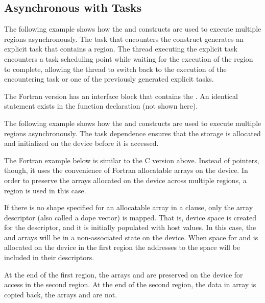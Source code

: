 \subsection{Asynchronous  with Tasks}
\label{subsec:async_target_with_tasks}

The following example shows how the  and  constructs 
are used to execute multiple  regions asynchronously. The task that 
encounters the  construct generates an explicit task that contains 
a  region. The thread executing the explicit task encounters a task 
scheduling point while waiting for the execution of the  region 
to complete, allowing the thread to switch back to the execution of the encountering 
task or one of the previously generated explicit tasks.


The Fortran version has an interface block that contains the  . 
An identical statement exists in the function declaration (not shown here).


The following example shows how the  and  constructs 
are used to execute multiple  regions asynchronously. The task dependence 
ensures that the storage is allocated and initialized on the device before it is 
accessed.


The Fortran example below is similar to the C version above. Instead of pointers, though, it uses
the convenience of Fortran allocatable arrays on the device. In order to preserve the arrays 
allocated on the device across multiple  regions, a ~ region 
is used in this case.

If there is no shape specified for an allocatable array in a  clause, only the array descriptor
(also called a dope vector) is mapped. That is, device space is created for the descriptor, and it
is initially populated with host values. In this case, the  and  arrays will be in a
non-associated state on the device. When space for  and  is allocated on the device
in the first  region the addresses to the space will be included in their descriptors.

At the end of the first  region, the arrays  and  are preserved on the device 
for access in the second  region. At the end of the second  region, the data 
in array  is copied back, the arrays  and  are not.


